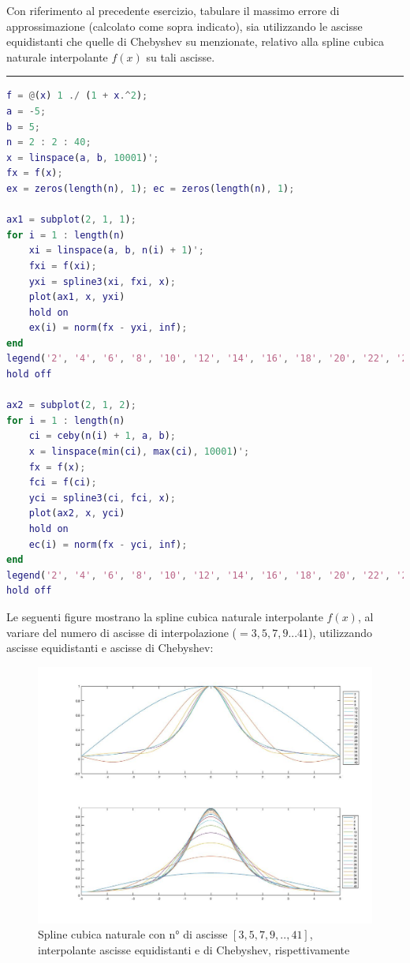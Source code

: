 Con riferimento al precedente esercizio, tabulare il massimo errore di approssimazione (calcolato come sopra indicato), sia utilizzando le ascisse equidistanti
che quelle di Chebyshev su menzionate, relativo alla spline cubica naturale interpolante $f(x)$ su tali ascisse.

\hspace*{\fill}
\par\noindent\rule{\textwidth}{0.4pt}
\hspace*{\fill}

\begin{lstlisting}[language=Matlab, caption=Codice Matlab]
f = @(x) 1 ./ (1 + x.^2);
a = -5;
b = 5;
n = 2 : 2 : 40;
x = linspace(a, b, 10001)';
fx = f(x);
ex = zeros(length(n), 1); ec = zeros(length(n), 1);

ax1 = subplot(2, 1, 1);
for i = 1 : length(n)
	xi = linspace(a, b, n(i) + 1)';
	fxi = f(xi);
	yxi = spline3(xi, fxi, x);
	plot(ax1, x, yxi)
	hold on
	ex(i) = norm(fx - yxi, inf);
end
legend('2', '4', '6', '8', '10', '12', '14', '16', '18', '20', '22', '24', '26', '28', '30', '32', '34', '36', '38', '40')
hold off

ax2 = subplot(2, 1, 2);
for i = 1 : length(n)
	ci = ceby(n(i) + 1, a, b);
	x = linspace(min(ci), max(ci), 10001)';
	fx = f(x);
	fci = f(ci);
	yci = spline3(ci, fci, x);
	plot(ax2, x, yci)
	hold on
	ec(i) = norm(fx - yci, inf);
end
legend('2', '4', '6', '8', '10', '12', '14', '16', '18', '20', '22', '24', '26', '28', '30', '32', '34', '36', '38', '40')
hold off
\end{lstlisting}

Le seguenti figure mostrano la spline cubica naturale interpolante $f(x)$, al variare del numero di ascisse di interpolazione ($=3,5,7,9...41$), utilizzando ascisse equidistanti e ascisse di Chebyshev:
\begin{figure}[H]
	\includegraphics[width=\textwidth]{Chapter-4/Exercise-20/plot.jpg}
	\caption*{Spline cubica naturale con n° di ascisse $[3,5,7,9,..,41]$, interpolante ascisse equidistanti e di Chebyshev, rispettivamente}
\end{figure}

